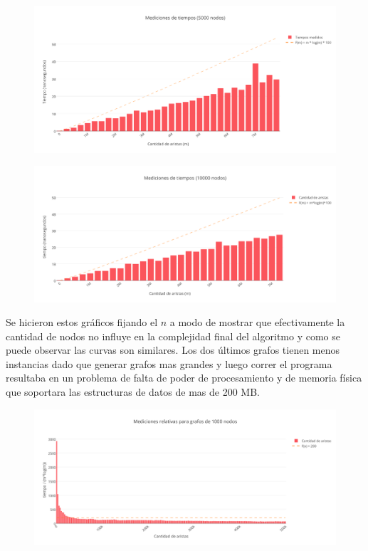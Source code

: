  \begin{figure}[h!]
	\centering
 	\includegraphics[scale=0.7]{imagenes/ej3/tiempos5000B.png}
 \end{figure}

 \begin{figure}[h!]
	\centering
 	\includegraphics[scale=0.7]{imagenes/ej3/tiempos10000B.png}
 \end{figure}

 Se hicieron estos gráficos fijando el $n$ a modo de mostrar que efectivamente la cantidad de nodos no influye en la complejidad final del algoritmo y como se puede observar las curvas son similares. Los dos últimos grafos tienen menos instancias dado que generar grafos mas grandes y luego correr el programa resultaba en un problema de falta de poder de procesamiento y de memoria física que soportara las estructuras de datos de mas de 200 MB.

\newpage

 \begin{figure}[h!]
	\centering
 	\includegraphics[scale=0.7]{imagenes/ej3/mlogm1000B.png}
 \end{figure}

